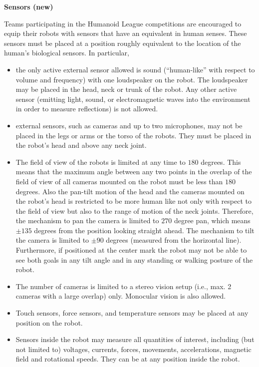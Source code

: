 {\bfseries Sensors (new)}

\headlinebox

Teams participating in the Humanoid League competitions are encouraged to equip their robots with sensors that have an equivalent in human senses. These sensors must be placed at a position roughly equivalent to the location of the human{\textquoteright}s biological sensors. In particular, 

\begin{itemize}
\item the only active external sensor allowed is sound
(``human-like'' with respect to volume and frequency) with one loudspeaker on the robot. The loudspeaker may be placed in the head, neck or trunk of the robot. Any
other active sensor (emitting light, sound, or electromagnetic waves into the environment in order to measure reflections) is not allowed. 
\item external sensors, such as cameras and up to two microphones, may not be placed in the legs or arms or the
torso of the robots. They must be placed in the robot's
head and above any neck joint. 
\item The field of view of the robots is limited at any time to $180$ degrees. This means that the maximum angle between any two points in the overlap of the field of view of all cameras mounted on the robot must be less than $180$ degrees. Also the pan-tilt motion of the head and the cameras mounted on the robot's head is restricted to be more human like not only with respect to the field of view but also to the range of motion of the neck joints. Therefore, the mechanism to pan the camera is limited to $270$ degree pan, which means $\pm135$ degrees from the position looking straight ahead. The mechanism to tilt the camera is limited to $\pm90$ degrees (measured from the horizontal line). Furthermore, if positioned at the center mark the robot may not be able to see both goals in any tilt angle and in any standing or walking posture of the robot. 
\item The number of cameras is limited to a stereo vision setup (i.e., max. 2 cameras with a large overlap) only. Monocular vision is also allowed.
\item Touch sensors, force sensors, and temperature sensors may be placed at any position on the robot.
\item Sensors inside the robot may measure all quantities of interest, including (but not limited to) voltages, currents, forces, movements, accelerations, magnetic field and rotational speeds. They can be at any position inside the robot.
\end{itemize}

